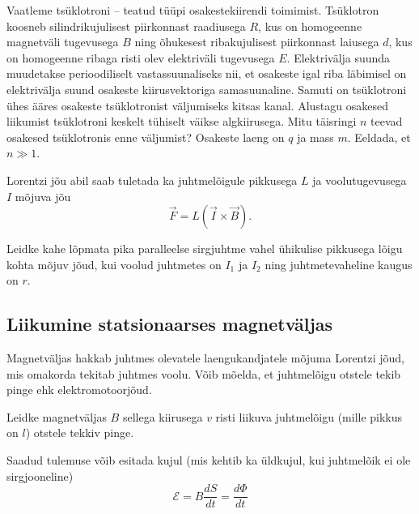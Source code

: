 \documentclass[a4paper,11pt,twocolumn]{article}
\begin{document}
\begin{question}[Piirk 2018, G10]
    Vaatleme tsüklotroni -- teatud tüüpi osakestekiirendi toimimist. Tsüklotron koosneb silindrikujulisest piirkonnast raadiusega $R$, kus on homogeenne magnetväli tugevusega $B$ ning õhukesest ribakujulisest piirkonnast laiusega $d$, kus on homogeenne ribaga risti olev elektriväli tugevusega $E$. Elektrivälja suunda muudetakse perioodiliselt vastassuunaliseks nii, et osakeste igal riba läbimisel on elektrivälja suund osakeste kiirusvektoriga samasuunaline. Samuti on tsüklotroni ühes ääres osakeste tsüklotronist väljumiseks kitsas kanal. Alustagu osakesed liikumist tsüklotroni keskelt tühiselt väikse algkiirusega. Mitu täisringi $n$ teevad osakesed tsüklotronis enne väljumist? Osakeste laeng on $q$ ja mass $m$. Eeldada, et $n\gg 1$.
\end{question}

Lorentzi jõu abil saab tuletada ka juhtmelõigule pikkusega $L$ ja voolutugevusega $I$ mõjuva jõu
\begin{equation}
    \vec{F}=L(\vec{I}\times \vec{B}) \tag{Ampere'i seadus}.
\end{equation}

\begin{question}
    Leidke kahe lõpmata pika paralleelse sirgjuhtme vahel ühikulise pikkusega lõigu kohta mõjuv jõud, kui voolud juhtmetes on \( I_1 \) ja \( I_2 \) ning juhtmetevaheline kaugus on \( r \).
\end{question}

\subsection{Liikumine statsionaarses magnetväljas}

Magnetväljas hakkab juhtmes olevatele laengukandjatele mõjuma Lorentzi jõud, mis omakorda tekitab juhtmes voolu. Võib mõelda, et juhtmelõigu otstele tekib pinge ehk elektromotoorjõud.

\begin{question}
    Leidke magnetväljas $B$ sellega kiirusega $v$ risti liikuva juhtmelõigu (mille pikkus on $l$) otstele tekkiv pinge.
\end{question}

Saadud tulemuse võib esitada kujul (mis kehtib ka üldkujul, kui juhtmelõik ei ole sirgjooneline)
\[ \mathcal{E}=B \frac{dS}{dt}=\frac{d\Phi}{dt} \]
\end{document}

